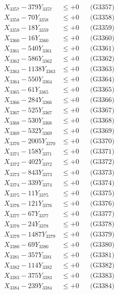 \documentclass[a4paper,10pt]{article}
\begin{document}
{\begin{align}
X_{3357} - 379Y_{3357} &\leq +0 && \text{(G3357)} \\
X_{3358} - 70Y_{3358} &\leq +0 && \text{(G3358)} \\
X_{3359} - 18Y_{3359} &\leq +0 && \text{(G3359)} \\
X_{3360} - 16Y_{3360} &\leq +0 && \text{(G3360)} \\
\allowbreak
X_{3361} - 540Y_{3361} &\leq +0 && \text{(G3361)} \\
X_{3362} - 586Y_{3362} &\leq +0 && \text{(G3362)} \\
X_{3363} - 1138Y_{3363} &\leq +0 && \text{(G3363)} \\
X_{3364} - 550Y_{3364} &\leq +0 && \text{(G3364)} \\
X_{3365} - 61Y_{3365} &\leq +0 && \text{(G3365)} \\
X_{3366} - 284Y_{3366} &\leq +0 && \text{(G3366)} \\
X_{3367} - 525Y_{3367} &\leq +0 && \text{(G3367)} \\
X_{3368} - 530Y_{3368} &\leq +0 && \text{(G3368)} \\
X_{3369} - 532Y_{3369} &\leq +0 && \text{(G3369)} \\
X_{3370} - 2005Y_{3370} &\leq +0 && \text{(G3370)} \\
\allowbreak
X_{3371} - 158Y_{3371} &\leq +0 && \text{(G3371)} \\
X_{3372} - 402Y_{3372} &\leq +0 && \text{(G3372)} \\
X_{3373} - 843Y_{3373} &\leq +0 && \text{(G3373)} \\
X_{3374} - 339Y_{3374} &\leq +0 && \text{(G3374)} \\
X_{3375} - 11Y_{3375} &\leq +0 && \text{(G3375)} \\
X_{3376} - 121Y_{3376} &\leq +0 && \text{(G3376)} \\
X_{3377} - 67Y_{3377} &\leq +0 && \text{(G3377)} \\
X_{3378} - 24Y_{3378} &\leq +0 && \text{(G3378)} \\
X_{3379} - 1487Y_{3379} &\leq +0 && \text{(G3379)} \\
X_{3380} - 69Y_{3380} &\leq +0 && \text{(G3380)} \\
\allowbreak
X_{3381} - 357Y_{3381} &\leq +0 && \text{(G3381)} \\
X_{3382} - 114Y_{3382} &\leq +0 && \text{(G3382)} \\
X_{3383} - 375Y_{3383} &\leq +0 && \text{(G3383)} \\
X_{3384} - 239Y_{3384} &\leq +0 && \text{(G3384)} \\

\end{align}}
\end{document}
